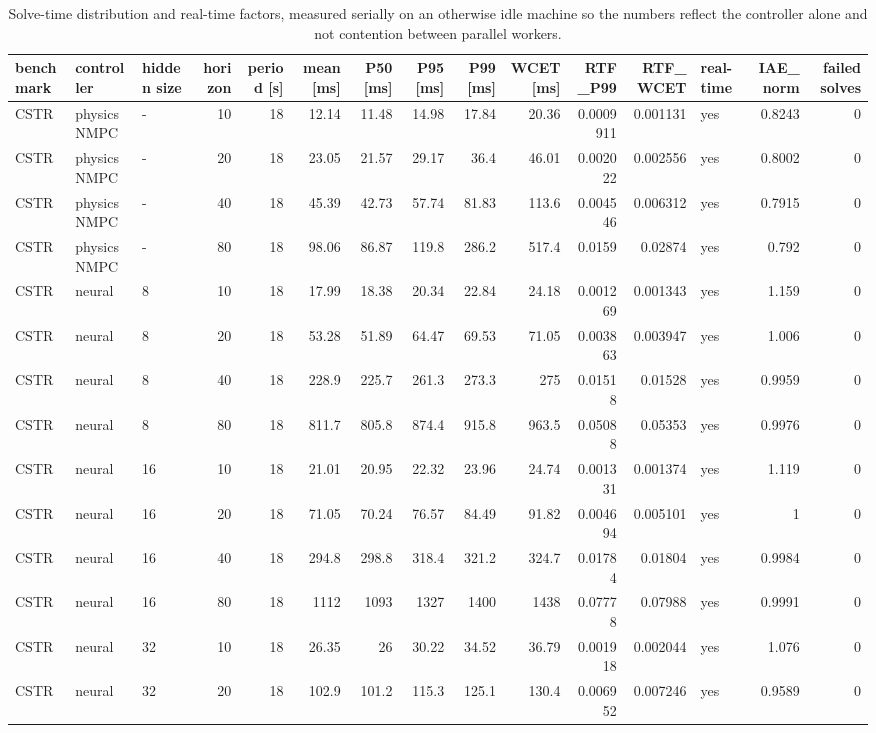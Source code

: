 \begin{table}
\caption{Solve-time distribution and real-time factors, measured serially on an otherwise idle machine so the numbers reflect the controller alone and not contention between parallel workers.}
\label{tab:T4_real_time_feasibility}
\begin{tabular}{lllrrrrrrrrrlrr}
\toprule
benchmark & controller & hidden size & horizon & period [s] & mean [ms] & P50 [ms] & P95 [ms] & P99 [ms] & WCET [ms] & RTF\_P99 & RTF\_WCET & real-time & IAE\_norm & failed solves \\
\midrule
CSTR & physics NMPC & - & 10 & 18 & 12.14 & 11.48 & 14.98 & 17.84 & 20.36 & 0.0009911 & 0.001131 & yes & 0.8243 & 0 \\
CSTR & physics NMPC & - & 20 & 18 & 23.05 & 21.57 & 29.17 & 36.4 & 46.01 & 0.002022 & 0.002556 & yes & 0.8002 & 0 \\
CSTR & physics NMPC & - & 40 & 18 & 45.39 & 42.73 & 57.74 & 81.83 & 113.6 & 0.004546 & 0.006312 & yes & 0.7915 & 0 \\
CSTR & physics NMPC & - & 80 & 18 & 98.06 & 86.87 & 119.8 & 286.2 & 517.4 & 0.0159 & 0.02874 & yes & 0.792 & 0 \\
CSTR & neural & 8 & 10 & 18 & 17.99 & 18.38 & 20.34 & 22.84 & 24.18 & 0.001269 & 0.001343 & yes & 1.159 & 0 \\
CSTR & neural & 8 & 20 & 18 & 53.28 & 51.89 & 64.47 & 69.53 & 71.05 & 0.003863 & 0.003947 & yes & 1.006 & 0 \\
CSTR & neural & 8 & 40 & 18 & 228.9 & 225.7 & 261.3 & 273.3 & 275 & 0.01518 & 0.01528 & yes & 0.9959 & 0 \\
CSTR & neural & 8 & 80 & 18 & 811.7 & 805.8 & 874.4 & 915.8 & 963.5 & 0.05088 & 0.05353 & yes & 0.9976 & 0 \\
CSTR & neural & 16 & 10 & 18 & 21.01 & 20.95 & 22.32 & 23.96 & 24.74 & 0.001331 & 0.001374 & yes & 1.119 & 0 \\
CSTR & neural & 16 & 20 & 18 & 71.05 & 70.24 & 76.57 & 84.49 & 91.82 & 0.004694 & 0.005101 & yes & 1 & 0 \\
CSTR & neural & 16 & 40 & 18 & 294.8 & 298.8 & 318.4 & 321.2 & 324.7 & 0.01784 & 0.01804 & yes & 0.9984 & 0 \\
CSTR & neural & 16 & 80 & 18 & 1112 & 1093 & 1327 & 1400 & 1438 & 0.07778 & 0.07988 & yes & 0.9991 & 0 \\
CSTR & neural & 32 & 10 & 18 & 26.35 & 26 & 30.22 & 34.52 & 36.79 & 0.001918 & 0.002044 & yes & 1.076 & 0 \\
CSTR & neural & 32 & 20 & 18 & 102.9 & 101.2 & 115.3 & 125.1 & 130.4 & 0.006952 & 0.007246 & yes & 0.9589 & 0 \\

\end{tabular}
\end{table}
